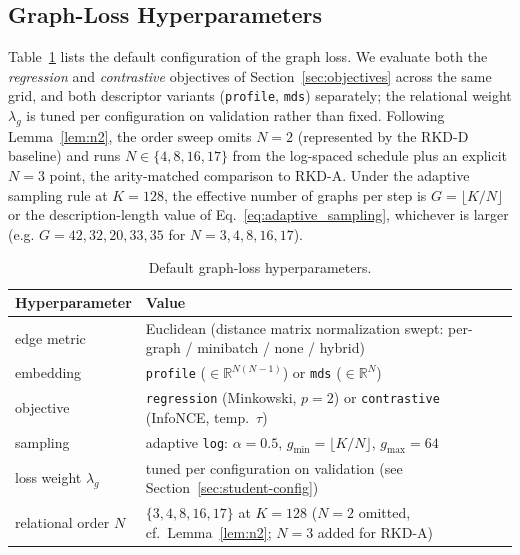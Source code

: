 \documentclass[11pt,letterpaper]{article}
\begin{document}
\subsection{Graph-Loss Hyperparameters}
\label{sec:graph-config}

Table~\ref{tab:graph-hparams} lists the default configuration of the graph loss. We
evaluate both the \emph{regression} and \emph{contrastive} objectives of
Section~\ref{sec:objectives} across the same grid, and both descriptor variants
(\texttt{profile}, \texttt{mds}) separately; the relational weight $\lambda_g$ is
tuned per configuration on validation rather than fixed. Following Lemma~\ref{lem:n2},
the order sweep omits $N = 2$ (represented by the RKD-D baseline) and runs
$N \in \{4, 8, 16, 17\}$ from the log-spaced schedule plus an explicit $N = 3$ point,
the arity-matched comparison to RKD-A. Under the adaptive sampling rule at $K = 128$,
the effective number of graphs per step is $G = \lfloor K/N \rfloor$ or the
description-length value of Eq.~\ref{eq:adaptive_sampling}, whichever is larger (e.g.
$G = 42, 32, 20, 33, 35$ for $N = 3, 4, 8, 16, 17$).

\begin{table}[htbp]
    \centering
    \small
    \caption{Default graph-loss hyperparameters.}
    \label{tab:graph-hparams}
    \begin{tabularx}{\linewidth}{@{}l X@{}}
        \toprule
        Hyperparameter & Value \\
        \midrule
        edge metric & Euclidean (distance matrix normalization swept: per-graph / minibatch / none / hybrid) \\
        embedding & \texttt{profile} ($\in \mathbb{R}^{N(N-1)}$) or \texttt{mds} ($\in \mathbb{R}^{N}$) \\
        objective & \texttt{regression} (Minkowski, $p=2$) or \texttt{contrastive} (InfoNCE, temp.\ $\tau$) \\
        sampling & adaptive \texttt{log}: $\alpha = 0.5$, $g_{\min} = \lfloor K/N \rfloor$, $g_{\max} = 64$ \\
        loss weight $\lambda_g$ & tuned per configuration on validation (see Section~\ref{sec:student-config}) \\
        relational order $N$ & $\{3, 4, 8, 16, 17\}$ at $K{=}128$ ($N{=}2$ omitted, cf.\ Lemma~\ref{lem:n2}; $N{=}3$ added for RKD-A) \\
        \bottomrule
    \end{tabularx}
\end{table}
\end{document}
